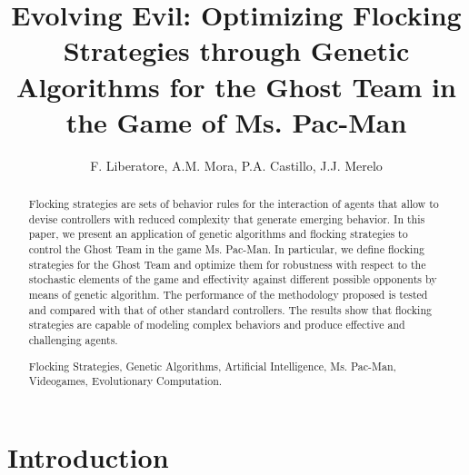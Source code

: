 \documentclass[a4paper]{llncs}
\newcommand{\keywords}[1]{\par\addvspace\baselineskip
\noindent\keywordname\enspace\ignorespaces#1}
\begin{document}
\mainmatter

%
%

\title{Evolving Evil: Optimizing Flocking Strategies through Genetic Algorithms for the Ghost Team in the Game of Ms. Pac-Man}

%
%

\author{F. Liberatore, A.M. Mora, P.A. Castillo, J.J. Merelo}

\maketitle

%
%
\begin{abstract} 
Flocking strategies are sets of behavior rules for the interaction of agents that allow to devise controllers with reduced complexity that generate emerging behavior. In this paper, we present an application of genetic algorithms and flocking strategies to control the Ghost Team in the game Ms. Pac-Man. In particular, we define flocking strategies for the Ghost Team and optimize them for robustness with respect to the stochastic elements of the game and effectivity against different possible opponents by means of genetic algorithm. The performance of the methodology proposed is tested and compared with that of other standard controllers. The results show that flocking strategies are capable of modeling complex behaviors and produce effective and challenging agents.
\keywords{Flocking Strategies, Genetic Algorithms, Artificial Intelligence, Ms. Pac-Man, Videogames, Evolutionary Computation.}
\end{abstract}

%
%
\section{Introduction}
\label{sec:intro}
\end{document}
